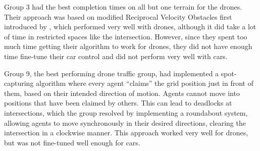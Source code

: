\documentclass[a4paper,12pt]{article}
\begin{document}


Group 3 had the best completion times on all but one terrain for the drones. Their approach was based on modified Reciprocal Velocity Obstacles first introduced by \cite{Snape2011TheHR}, which performed very well with drones, although it did take a lot of time in restricted spaces like the intersection. However, since they spent too much time getting their algorithm to work for drones, they did not have enough time fine-tune their car control and did not perform very well with cars.

Group 9, the best performing drone traffic group, had implemented a spot-capturing algorithm where every agent ``claims'' the grid position just in front of them, based on their intended direction of motion. Agents cannot move into positions that have been claimed by others. This can lead to deadlocks at intersections, which the group resolved by implementing a roundabout system, allowing agents to move synchronously in their desired directions, clearing the intersection in a clockwise manner. This approach worked very well for drones, but was not fine-tuned well enough for cars.
\end{document}
